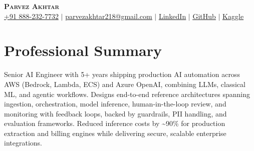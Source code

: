 \documentclass[11pt,a4paper]{article}
\begin{document}
\begin{center}
    \textbf{\Huge \scshape Parvez Akhtar} \\ \vspace{1pt}
    \small \href{tel:+918882327732}{+91 888-232-7732} $\vert$ \href{mailto:parvezakhtar218@gmail.com}{\underline{parvezakhtar218@gmail.com}} $\vert$
    \href{https://www.linkedin.com/in/parvezakhtar/}{\underline{LinkedIn}} $\vert$
    \href{https://github.com/ipmob}{\underline{GitHub}} $\vert$
    \href{https://www.kaggle.com/parvez218}{\underline{Kaggle}}
\end{center}

\section{Professional Summary}
\small{Senior AI Engineer with 5+ years shipping production AI automation across AWS (Bedrock, Lambda, ECS) and Azure OpenAI, combining LLMs, classical ML, and agentic workflows. Designs end-to-end reference architectures spanning ingestion, orchestration, model inference, human-in-the-loop review, and monitoring with feedback loops, backed by guardrails, PII handling, and evaluation frameworks. Reduced inference costs by \textasciitilde{}90\% for production extraction and billing engines while delivering secure, scalable enterprise integrations.}

\end{document}

